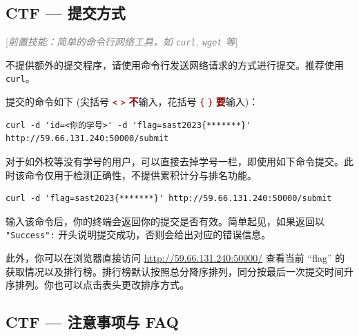 \documentclass{article}
\begin{document}
	\subsection{CTF --- 提交方式}
	\label{sss:ctfsubmit}

	\textcolor{gray}{[\textit{前置技能：简单的命令行网络工具，如 \texttt{curl}, \texttt{wget} 等}]}

	不提供额外的提交程序，请使用命令行发送网络请求的方式进行提交。推荐使用 \texttt{curl}。

	提交的命令如下 (尖括号 \textcolor{maroon}{\texttt< \texttt> \textbf 不}输入，花括号 \textcolor{maroon}{\texttt\{ \texttt\} \textbf 要}输入)：

	\begin{verbatim}
curl -d 'id=<你的学号>' -d 'flag=sast2023{*******}' http://59.66.131.240:50000/submit
	\end{verbatim}

	\vspace{-6pt}
	对于如外校等没有学号的用户，可以直接去掉学号一栏，即使用如下命令提交。此时该命令仅用于检测正确性，不提供累积计分与排名功能。

	\begin{verbatim}
curl -d 'flag=sast2023{*******}' http://59.66.131.240:50000/submit
	\end{verbatim}

	\vspace{-6pt}
	输入该命令后，你的终端会返回你的提交是否有效。简单起见，如果返回以 \texttt{"Success":} 开头说明提交成功，否则会给出对应的错误信息。

	此外，你可以在浏览器直接访问 \url{http://59.66.131.240:50000/} 查看当前 ``flag'' 的获取情况以及排行榜。排行榜默认按照总分降序排列，同分按最后一次提交时间升序排列。你也可以点击表头更改排序方式。

	\subsection{CTF --- 注意事项与 FAQ}
\end{document}
